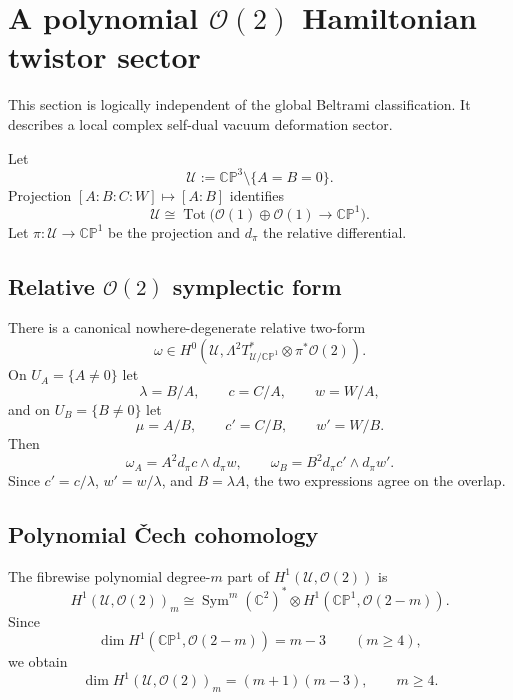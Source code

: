 \documentclass[aps,prd,reprint,nofootinbib,superscriptaddress]{revtex4-2}
\theoremstyle{definition}
\theoremstyle{remark}
\newcommand{\C}{\mathbb{C}}
\newcommand{\CP}{\mathbb{CP}}
\newcommand{\cO}{\mathcal{O}}
\newcommand{\cU}{\mathcal{U}}
\newcommand{\Sym}{\operatorname{Sym}}
\begin{document}
\section{A polynomial \texorpdfstring{$\cO(2)$}{O(2)} Hamiltonian twistor sector}
\label{sec:twistor}

This section is logically independent of the global Beltrami classification. It describes a local complex self-dual vacuum deformation sector.

Let
\begin{equation}
\cU:=\CP^3\setminus\{A=B=0\}.
\label{eq:Udef}
\end{equation}
Projection $[A:B:C:W]\mapsto[A:B]$ identifies
\begin{equation}
\cU\cong\operatorname{Tot}\bigl(\cO(1)\oplus\cO(1)\to\CP^1\bigr).
\label{eq:totalspace}
\end{equation}
Let $\pi:\cU\to\CP^1$ be the projection and $d_\pi$ the relative differential.

\subsection{Relative \texorpdfstring{$\cO(2)$}{O(2)} symplectic form}

There is a canonical nowhere-degenerate relative two-form
\begin{equation}
\omega\in H^0\!\left(
\cU,\Lambda^2T^*_{\cU/\CP^1}\otimes\pi^*\cO(2)
\right).
\label{eq:omegaGlobal}
\end{equation}
On $U_A=\{A\ne0\}$ let
\[
\lambda=B/A,
\qquad c=C/A,
\qquad w=W/A,
\]
and on $U_B=\{B\ne0\}$ let
\[
\mu=A/B,
\qquad c'=C/B,
\qquad w'=W/B.
\]
Then
\begin{equation}
\omega_A=A^2d_\pi c\wedge d_\pi w,
\qquad
\omega_B=B^2d_\pi c'\wedge d_\pi w'.
\label{eq:omegaCharts}
\end{equation}
Since $c'=c/\lambda$, $w'=w/\lambda$, and $B=\lambda A$, the two expressions agree on the overlap.

\subsection{Polynomial \v{C}ech cohomology}

The fibrewise polynomial degree-$m$ part of $H^1(\cU,\cO(2))$ is
\begin{equation}
H^1(\cU,\cO(2))_m
\cong
\Sym^m(\C^2)^*\otimes H^1(\CP^1,\cO(2-m)).
\label{eq:gradedH1}
\end{equation}
Since
\begin{equation}
\dim H^1(\CP^1,\cO(2-m))=m-3
\qquad(m\ge4),
\label{eq:H1base}
\end{equation}
we obtain
\begin{equation}
\dim H^1(\cU,\cO(2))_m=(m+1)(m-3),
\qquad m\ge4.
\label{eq:H1dim}
\end{equation}
\end{document}
